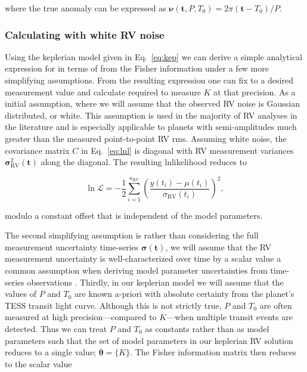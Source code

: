 \noindent where the true anomaly can be expressed as $\boldsymbol{\nu}(\mathbf{t},P,T_0) =2\pi(\mathbf{t}-T_0)/P$.

\subsubsection{Calculating \sigK{} with white RV noise} \label{sect:fisherwhite}
Using the keplerian model given in Eq.~\ref{eq:kep} we can derive a simple analytical expression for
\sigK{} in terms of \nrv{} from the Fisher information under a few more simplifying assumptions. 
From the resulting expression one can fix \sigK{} to a desired measurement value and calculate \nrv{}
required to measure $K$ at that precision. As a initial assumption, where we will assume that the observed
RV noise is Gaussian distributed, or white.
This assumption is used in the majority of RV analyses in the literature and
is especially applicable to planets with semi-amplitudes much greater than the measured point-to-point RV rms.
Assuming white noise, the covariance matrix $C$ in Eq.~\ref{eq:lnl} is diagonal with RV measurement variances
$\boldsymbol{\sigma}_{\text{RV}}^2(\mathbf{t})$ along the diagonal. The resulting lnlikelihood reduces to

\begin{equation}
  \ln{\mathcal{L}} = -\frac{1}{2} \sum^{n_{\text{RV}}}_{i=1} \left( \frac{y(t_i)-\mu(t_i)}{\sigma_{\text{RV}}(t_i)} \right)^2,
  \label{eq:lnl2}
\end{equation}

\noindent modulo a constant offset that is independent of the model parameters.

The second simplifying assumption is rather
than considering the full measurement uncertainty time-series $\boldsymbol{\sigma}(\mathbf{t})$, we will
assume that the RV measurement uncertainty is well-characterized over time by a scalar value \sigRV{;} a common
assumption when deriving model parameter uncertainties from time-series observations \cite[e.g.][]{gaudi07, carter08}.
Thirdly, in our keplerian model 
we will assume that the values of $P$ and $T_0$ are known a-priori with absolute certainty
from the planet's TESS transit light curve. Although this is not strictly true, $P$ and $T_0$ are often
measured at high precision---compared to $K$---when multiple transit events are detected.
Thus we can treat $P$ and $T_0$ as constants rather than as model parameters such
that the set of model parameters in our keplerian RV solution reduces to a single value;
$\boldsymbol{\theta}=\{K\}$. The Fisher information matrix then reduces to the scalar value

